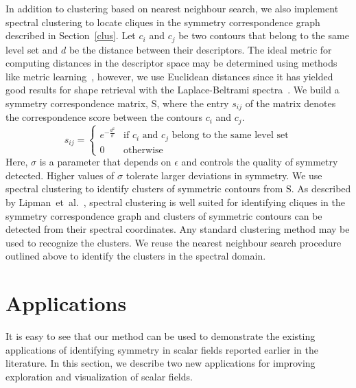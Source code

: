 \documentclass[review,journal]{vgtc}         %
\begin{document}
In addition to clustering based on nearest neighbour search,
we also implement spectral clustering to locate cliques in the symmetry
correspondence graph described in Section~\ref{clus}.
Let $c_i$ and $c_j$ be two contours that belong to the same level set and $d$ be
the distance between their descriptors. The ideal metric for computing
distances in the descriptor space may be determined using methods like
metric learning~\cite{Kulis13}, however, we use
Euclidean distances since it has yielded good results 
for shape retrieval with the Laplace-Beltrami spectra~\cite{reuter2006laplace,lian2013}. 
We build a symmetry correspondence matrix, $\mathrm{S}$, where the entry $s_{ij}$ of the
matrix denotes the correspondence score between the contours $c_i$
and $c_j$.
$$s_{ij} = 
\begin{cases}
	e^{-\frac{d^2}{\sigma}} & \text{if $c_i$ and $c_j$ belong to the same level set}\\
	0 & \text{otherwise}
\end{cases}
$$
Here, $\sigma$ is a parameter that depends on $\epsilon$ and controls the quality of symmetry detected.
Higher values of $\sigma$ tolerate larger deviations in symmetry. We use spectral clustering
to identify clusters of symmetric contours from $\mathrm{S}$. As described by 
Lipman~et~al.~\cite{Lip10}, spectral clustering is well suited for identifying
cliques in the symmetry correspondence graph and clusters of symmetric
contours can be detected from their spectral coordinates. Any standard clustering
method may be used to recognize the clusters. We reuse the nearest neighbour search
procedure outlined above to identify the clusters in the spectral domain.
\section{Applications}
It is easy to see that our method can be used to demonstrate the existing
applications of identifying symmetry in scalar fields reported earlier
in the literature. In this section, we describe two new applications
for improving exploration and visualization of scalar fields.
\end{document}
